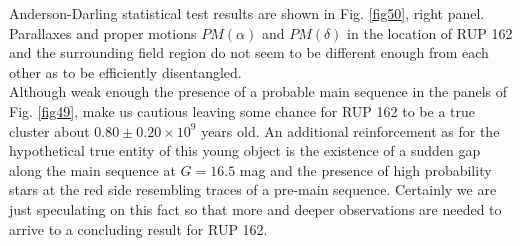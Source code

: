 \documentclass[referee]{aa}
\begin{document}
Anderson-Darling statistical test results are shown in Fig. \ref{fig50}, right
panel. Parallaxes and proper motions $PM(\alpha)$ and $PM(\delta)$ in the
location of RUP 162 and the surrounding field region do not seem to be
different enough from each other as to be efficiently disentangled.\\

Although weak enough the presence of a probable main sequence in the 
panels of Fig. \ref{fig49}, make us cautious leaving some chance for RUP 162 to
be a true cluster about $0.80\pm0.20\times10^9$ years old.
An additional reinforcement as for the hypothetical true entity of this young
object is the existence of a sudden gap along the main sequence at $G=16.5$ mag
and the presence of high probability stars at the red side resembling traces of
a pre-main sequence. Certainly we are just speculating on this fact so that
more and deeper observations are needed to arrive to a concluding result for
RUP 162.
\end{document}
